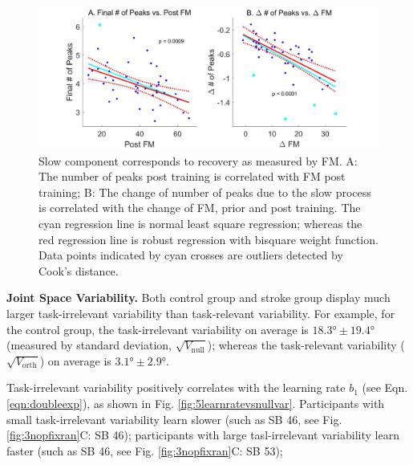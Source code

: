 \begin{figure}
	\centering
	\includegraphics[width=1\linewidth]{figures/4slowComponentIsRecovery}
	\caption[Slow component corresponds to recovery as meaured by FM]
	{Slow component corresponds to recovery as measured by FM. 
		A: The number of peaks post training is correlated with FM post training;
		B: The change of number of peaks due to the slow process is correlated with the change of FM, prior and post training.
		The cyan regression line is normal least square regression; whereas the red regression line is robust regression with bisquare weight function. 
		Data points indicated by cyan crosses are outliers detected by Cook's distance.
	}
	\label{fig:4slowcomponentisrecovery}
\end{figure}

\textbf{Joint Space Variability.}
Both control group and stroke group display much larger task-irrelevant variability than task-relevant variability.
For example, for the control group, the task-irrelevant variability on average is $ \ang{18.3} \pm \ang{19.4} $ (measured by standard deviation, $ \sqrt{V_\text{null}} $); whereas the task-relevant variability ($ \sqrt{V_\text{orth}} $) on average is $ \ang{3.1} \pm \ang{2.9} $.

Task-irrelevant variability positively correlates with the learning rate $ b_1 $ (see Eqn. \ref{eqn:doubleexp}), as shown in Fig. \ref{fig:5learnratevsnullvar}.
Participants with small task-irrelevant variability learn slower (such as SB 46, see Fig. \ref{fig:3nopfixran}C: SB 46);
participants with large tasl-irrelevant variability learn faster (such as SB 46, see Fig. \ref{fig:3nopfixran}C: SB 53);


